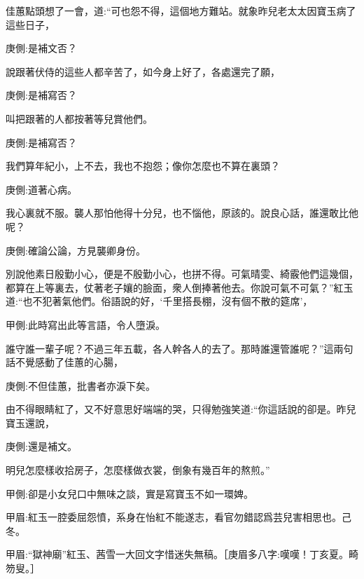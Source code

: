 \begin{parag}
    佳蕙點頭想了一會，道:“可也怨不得，這個地方難站。就象昨兒老太太因寶玉病了這些日子，\begin{note}庚側:是補文否？\end{note}說跟著伏侍的這些人都辛苦了，如今身上好了，各處還完了願，\begin{note}庚側:是補寫否？\end{note}叫把跟著的人都按著等兒賞他們。\begin{note}庚側:是補寫否？\end{note}我們算年紀小，上不去，我也不抱怨；像你怎麼也不算在裏頭？\begin{note}庚側:道著心病。\end{note}我心裏就不服。襲人那怕他得十分兒，也不惱他，原該的。說良心話，誰還敢比他呢？\begin{note}庚側:確論公論，方見襲卿身份。\end{note}別說他素日殷勤小心，便是不殷勤小心，也拼不得。可氣晴雯、綺霰他們這幾個，都算在上等裏去，仗著老子孃的臉面，衆人倒捧著他去。你說可氣不可氣？”紅玉道:“也不犯著氣他們。俗語說的好，‘千里搭長棚，沒有個不散的筵席’，\begin{note}甲側:此時寫出此等言語，令人墮淚。\end{note}誰守誰一輩子呢？不過三年五載，各人幹各人的去了。那時誰還管誰呢？”這兩句話不覺感動了佳蕙的心腸，\begin{note}庚側:不但佳蕙，批書者亦淚下矣。\end{note}由不得眼睛紅了，又不好意思好端端的哭，只得勉強笑道:“你這話說的卻是。昨兒寶玉還說，\begin{note}庚側:還是補文。\end{note}明兒怎麼樣收拾房子，怎麼樣做衣裳，倒象有幾百年的熬煎。”\begin{note}甲側:卻是小女兒口中無味之談，實是寫寶玉不如一環婢。\end{note}\begin{note}甲眉:紅玉一腔委屈怨憤，系身在怡紅不能遂志，看官勿錯認爲芸兒害相思也。己冬。\end{note}\begin{note}甲眉:“獄神廟”紅玉、茜雪一大回文字惜迷失無稿。［庚眉多八字:嘆嘆！丁亥夏。畸笏叟。］\end{note}
\end{parag}


